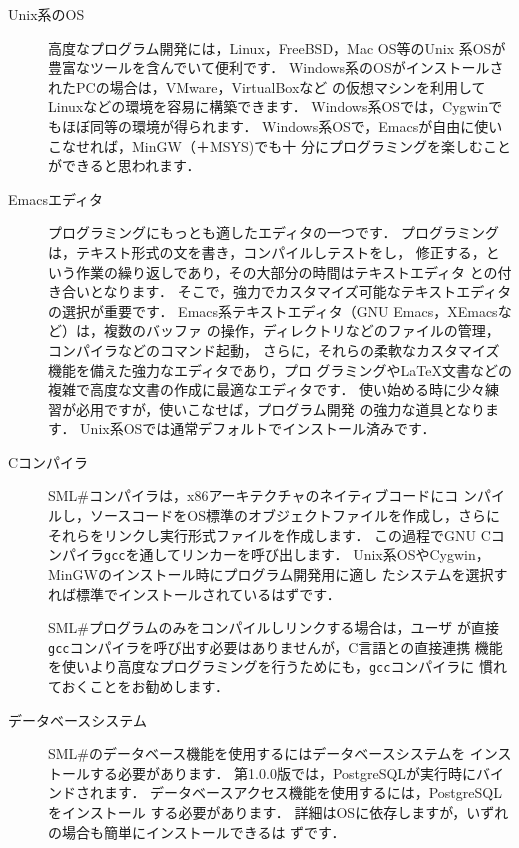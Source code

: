\documentclass{jbook}
\newcommand{\smlsharp}{SML\#}
\newcommand{\version}{1.0.0}
\begin{document}
\begin{description}
\item[Unix系のOS] 
	高度なプログラム開発には，Linux，FreeBSD，Mac OS等のUnix
系OSが豊富なツールを含んでいて便利です．
	Windows系のOSがインストールされたPCの場合は，VMware，VirtualBoxなど
の仮想マシンを利用してLinuxなどの環境を容易に構築できます．
	Windows系OSでは，Cygwinでもほぼ同等の環境が得られます．
	Windows系OSで，Emacsが自由に使いこなせれば，MinGW（＋MSYS)でも十
分にプログラミングを楽しむことができると思われます．

\item[Emacsエディタ]
	プログラミングにもっとも適したエディタの一つです．
	プログラミングは，テキスト形式の文を書き，コンパイルしテストをし，
修正する，という作業の繰り返しであり，その大部分の時間はテキストエディタ
との付き合いとなります．
	そこで，強力でカスタマイズ可能なテキストエディタの選択が重要です．
	Emacs系テキストエディタ（GNU Emacs，XEmacsなど）は，複数のバッファ
の操作，ディレクトリなどのファイルの管理，コンパイラなどのコマンド起動，
さらに，それらの柔軟なカスタマイズ機能を備えた強力なエディタであり，プロ
グラミングやLaTeX文書などの複雑で高度な文書の作成に最適なエディタです．
	使い始める時に少々練習が必用ですが，使いこなせば，プログラム開発
の強力な道具となります．
	Unix系OSでは通常デフォルトでインストール済みです．

\item[Cコンパイラ] 
	\smlsharp{}コンパイラは，x86アーキテクチャのネイティブコードにコ
ンパイルし，ソースコードをOS標準のオブジェクトファイルを作成し，さらに
それらをリンクし実行形式ファイルを作成します．
	この過程でGNU Cコンパイラ{\tt gcc}を通してリンカーを呼び出します．
	Unix系OSやCygwin，MinGWのインストール時にプログラム開発用に適し
たシステムを選択すれば標準でインストールされているはずです．

	\smlsharp{}プログラムのみをコンパイルしリンクする場合は，ユーザ
が直接{\tt gcc}コンパイラを呼び出す必要はありませんが，C言語との直接連携
機能を使いより高度なプログラミングを行うためにも，{\tt gcc}コンパイラに
慣れておくことをお勧めします．
\item[データベースシステム] 
	\smlsharp{}のデータベース機能を使用するにはデータベースシステムを
インストールする必要があります．
	第\version{}版では，PostgreSQLが実行時にバインドされます．
	データベースアクセス機能を使用するには，PostgreSQLをインストール
する必要があります．
	詳細はOSに依存しますが，いずれの場合も簡単にインストールできるは
ずです．
\end{description}
\end{document}
